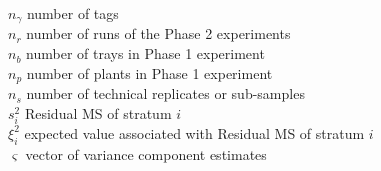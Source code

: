 \begin{tabbing}
$n_\gamma$ \> number of tags\\
$n_r$ \> number of runs of the Phase 2 experiments\\
$n_b$ \> number of trays in Phase 1 experiment\\
$n_p$ \> number of plants in Phase 1 experiment\\
$n_s$ \> number of technical replicates or sub-samples\\
$s^2_i$ \>  Residual MS of stratum $i$ \\
$\xi^2_i$ \> expected value associated with Residual MS of stratum $i$\\
$\bm{\varsigma}$ \> vector of variance component estimates \\ 
\end{tabbing}

